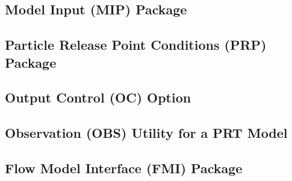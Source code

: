 %

%

\newpage
\subsection{Model Input (MIP) Package}


\newpage
\subsection{Particle Release Point Conditions (PRP) Package}


\newpage
\subsection{Output Control (OC) Option}


\newpage
\subsection{Observation (OBS) Utility for a PRT Model}


\newpage
\subsection{Flow Model Interface (FMI) Package}

